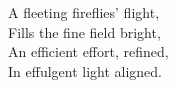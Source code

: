 \documentclass{article}
\begin{document}
A fleeting fireflies’ flight,\\
Fills the fine field bright,\\
An efficient effort, refined,\\
In effulgent light aligned.\\
\end{document}
